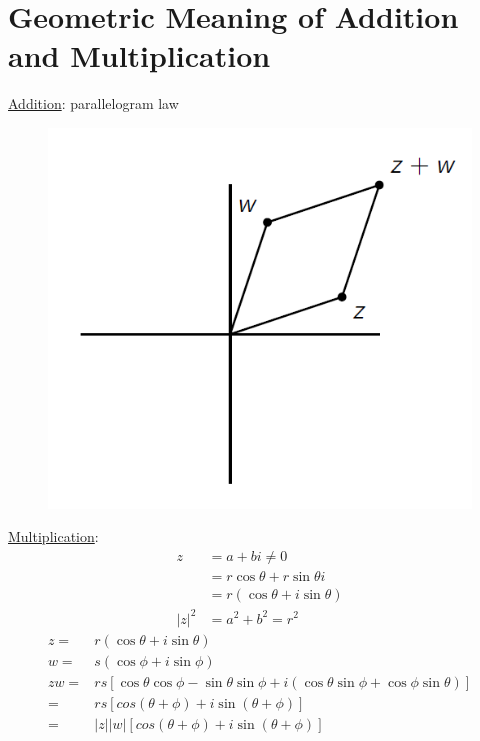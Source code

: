 \documentclass[11pt]{elegantbook}
\begin{document}
\section{Geometric Meaning of Addition and Multiplication}
\underline{Addition}: parallelogram law
\begin{center}\begin{figure}[htbp]
    \centering
    \includegraphics[scale=0.7]{Complex addition.png}
\end{figure}\end{center}
\underline{Multiplication}:
\begin{equation}
    \begin{aligned}
        z&=a+bi\neq0\\
        &=r \cos\theta+r \sin\theta i\\
        &=r (\cos\theta+i\sin\theta)\\
        |z|^2&=a^2+b^2=r^2
    \end{aligned}
    \nonumber
\end{equation}
\begin{equation}
    \begin{aligned}
        z=&r (\cos\theta+i\sin\theta)\\
        w=&s (\cos\phi+i\sin\phi)\\
        zw=&rs[\cos\theta\cos\phi-\sin\theta\sin\phi+i(\cos\theta\sin\phi+\cos\phi\sin\theta)]\\
        =&rs[cos(\theta+\phi)+i\sin(\theta+\phi)]\\
        =&|z||w|[cos(\theta+\phi)+i\sin(\theta+\phi)]
    \end{aligned}
    \nonumber
\end{equation}
\end{document}
